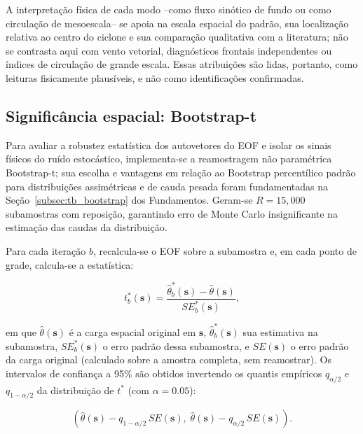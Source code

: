 A interpretação física de cada modo --como fluxo sinótico de fundo ou como circulação de mesoescala-- se apoia na escala espacial do padrão, sua localização relativa ao centro do ciclone e sua comparação qualitativa com a literatura; não se contrasta aqui com vento vetorial, diagnósticos frontais independentes ou índices de circulação de grande escala. Essas atribuições são lidas, portanto, como leituras fisicamente plausíveis, e não como identificações confirmadas.

\subsection{Significância espacial: Bootstrap-t}\label{subsec:bootstrap_significancia}

Para avaliar a robustez estatística dos autovetores do EOF e isolar os sinais físicos do ruído estocástico, implementa-se a reamostragem não paramétrica Bootstrap-t; sua escolha e vantagens em relação ao Bootstrap percentílico padrão para distribuições assimétricas e de cauda pesada foram fundamentadas na Seção~\ref{subsec:tb_bootstrap} dos Fundamentos. Geram-se $R = 15{,}000$ subamostras com reposição, garantindo erro de Monte Carlo insignificante na estimação das caudas da distribuição.

Para cada iteração $b$, recalcula-se o EOF sobre a subamostra e, em cada ponto de grade, calcula-se a estatística:

\begin{equation}\label{eq:bootstrap_t_espacial}
    t^*_b(\mathbf{s}) = \frac{\hat{\theta}^*_b(\mathbf{s}) - \hat{\theta}(\mathbf{s})}{SE^*_b(\mathbf{s})},
\end{equation}

em que $\hat{\theta}(\mathbf{s})$ é a carga espacial original em $\mathbf{s}$, $\hat{\theta}^*_b(\mathbf{s})$ sua estimativa na subamostra, $SE^*_b(\mathbf{s})$ o erro padrão dessa subamostra, e $SE(\mathbf{s})$ o erro padrão da carga original (calculado sobre a amostra completa, sem reamostrar). Os intervalos de confiança a 95\% são obtidos invertendo os quantis empíricos $q_{\alpha/2}$ e $q_{1-\alpha/2}$ da distribuição de $t^*$ (com $\alpha = 0.05$):

\begin{equation}\label{eq:bootstrap_ci_espacial}
    \left(\hat{\theta}(\mathbf{s}) - q_{1-\alpha/2}\,SE(\mathbf{s}),\; \hat{\theta}(\mathbf{s}) - q_{\alpha/2}\,SE(\mathbf{s})\right).
\end{equation}

